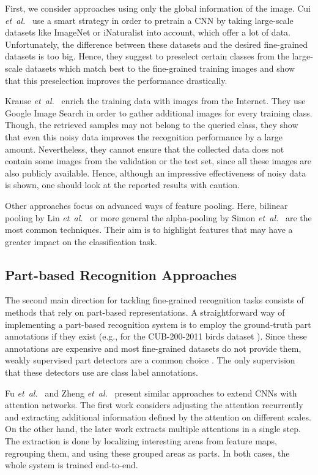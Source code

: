 \documentclass[runningheads]{llncs}
\newcommand{\etal}{\emph{et~al.}}
\begin{document}
First, we consider approaches using only the global information of the image.
Cui \etal~\cite{Cui_2018_CVPR_large} use a smart strategy in order to pretrain a CNN by taking large-scale datasets like ImageNet or iNaturalist into account, which offer a lot of data.
Unfortunately, the difference between these datasets and the desired fine-grained datasets is too big.
Hence, they suggest to preselect certain classes from the large-scale datasets which match best to the fine-grained training images and show that this preselection improves the performance drastically.

Krause \etal~\cite{krause2016unreasonable} enrich the training data with images from the Internet.
They use Google Image Search in order to gather additional images for every training class.
Though, the retrieved samples may not belong to the queried class, they show that even this noisy data improves the recognition performance by a large amount.
Nevertheless, they cannot ensure that the collected data does not contain some images from the validation or the test set, since all these images are also publicly available.
Hence, although an impressive effectiveness of noisy data is shown, one should look at the reported results with caution.

Other approaches focus on advanced ways of feature pooling.
Here, bilinear pooling by Lin \etal~\cite{lin2015bilinear} or more general the alpha-pooling by Simon \etal~\cite{Simon19:Implicit} are the most common techniques.
Their aim is to highlight features that may have a greater impact on the classification task.

\subsection{Part-based Recognition Approaches}
\label{sub:part_based_recognition}

The second main direction for tackling fine-grained recognition tasks consists of methods that rely on part-based representations.
A straightforward way of implementing a part-based recognition system is to employ the ground-truth part annotations if they exist (e.g., for the CUB-200-2011 birds dataset \cite{CUB_200_2011}).
Since these annotations are expensive and most fine-grained datasets do not provide them, weakly supervised part detectors are a common choice \cite{Fu_2017_CVPR,he2019and,Simon_2015_ICCV,zheng2017learning}.
The only supervision that these detectors use are class label annotations.

Fu \etal~\cite{Fu_2017_CVPR} and Zheng \etal~\cite{zheng2017learning} present similar approaches to extend CNNs with attention networks.
The first work considers adjusting the attention recurrently and extracting additional information defined by the attention on different scales.
On the other hand, the later work extracts multiple attentions in a single step.
The extraction is done by localizing interesting areas from feature maps, regrouping them, and using these grouped areas as parts.
In both cases, the whole system is trained end-to-end.
\end{document}
